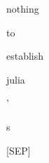 \documentclass[varwidth=150mm]{standalone}
\begin{document}
\begin{CJK*}{UTF8}{gbsn}
{{{\colorbox{red!4.779286861419678}{\strut nothing} \colorbox{red!0.0}{\strut to} \colorbox{red!0.0}{\strut establish} \colorbox{red!3.287268877029419}{\strut julia} \colorbox{red!1.4520870447158813}{\strut '} \colorbox{red!5.1190595626831055}{\strut s} \colorbox{red!5.839772701263428}{\strut [SEP]}
}}}
\end{CJK*}
\end{document}
